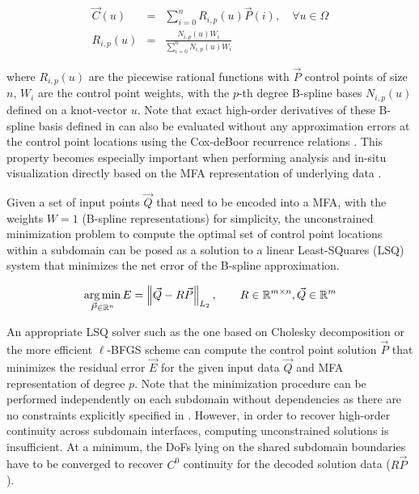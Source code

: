 \begin{eqnarray}
	\vec{C}(u) &=& \sum_{i=0}^{n} R_{i,p}(u) \vec{P}(i), \quad \forall u \in \Omega \\
	R_{i,p}(u) &=& \frac{N_{i,p}(u) W_i}{\sum_{i=0}^{n} N_{i,p}(u) W_i}
	\label{eq:nurbs-basis}
\end{eqnarray}

where $R_{i,p}(u)$ are the piecewise rational functions with $\vec{P}$ control points of size $n$, $W_i$ are the control point weights, with the $p$-th degree B-spline bases $N_{i,p}(u)$ defined on a knot-vector $u$. Note that exact high-order derivatives of these B-spline basis defined in  can also be evaluated without any approximation errors at the control point locations using the Cox-deBoor recurrence relations \cite{de1983approximation}. This property becomes especially important when performing analysis and in-situ visualization directly based on the MFA representation of underlying data \cite{mfa-vis-dvr}.

Given a set of input points $\vec{Q}$ that need to be encoded into a MFA, with the weights $W=1$ (B-spline representations) for simplicity, the unconstrained minimization problem to compute the optimal set of control point locations within a subdomain can be posed as a solution to a linear Least-SQuares (LSQ) system that minimizes the net error of the B-spline approximation.

\begin{eqnarray}
	\argmin_{\vec{P} \in \mathbb{R}^n} {E} = \left\lVert \vec{Q} - R \vec{P} \right\rVert_{L_2}, \quad \quad R \in \mathbb{R}^{m \times n}, \vec{Q} \in \mathbb{R}^m
	\label{eq:minimization-problem}
\end{eqnarray}

An appropriate LSQ solver such as the one based on Cholesky decomposition or the more efficient $\ell$-BFGS scheme \cite{zheng-bo-bspline-bfgs} can compute the control point solution $\vec{P}$ that minimizes the residual error $\vec{E}$ for the given input data $\vec{Q}$ and MFA representation of degree $p$. Note that the minimization procedure can be performed independently on each subdomain without dependencies as there are no constraints explicitly specified in .
%
However, in order to recover high-order continuity across subdomain interfaces, computing unconstrained solutions is insufficient. At a minimum, the DoFs lying on the shared subdomain boundaries have to be converged to recover $C^0$ continuity for the decoded solution data ($R \vec{P}$).
%


